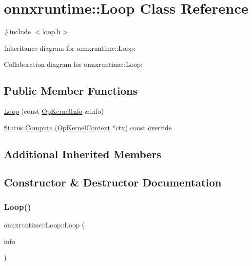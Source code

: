 \hypertarget{classonnxruntime_1_1Loop}{}\section{onnxruntime\+:\+:Loop Class Reference}
\label{classonnxruntime_1_1Loop}


{\ttfamily \#include $<$loop.\+h$>$}



Inheritance diagram for onnxruntime\+:\+:Loop\+:


Collaboration diagram for onnxruntime\+:\+:Loop\+:
\subsection*{Public Member Functions}
\begin{DoxyCompactItemize}
\item 
\mbox{\hyperlink{classonnxruntime_1_1Loop_a6a49331239b145bfb74d88288d8bff43}{Loop}} (const \mbox{\hyperlink{classonnxruntime_1_1OpKernelInfo}{Op\+Kernel\+Info}} \&info)
\item 
\mbox{\hyperlink{classonnxruntime_1_1common_1_1Status}{Status}} \mbox{\hyperlink{classonnxruntime_1_1Loop_acba8866150bcb6a81d05b59cd55d0b59}{Compute}} (\mbox{\hyperlink{classonnxruntime_1_1OpKernelContext}{Op\+Kernel\+Context}} $\ast$ctx) const override
\end{DoxyCompactItemize}
\subsection*{Additional Inherited Members}


\subsection{Constructor \& Destructor Documentation}
\mbox{\label{classonnxruntime_1_1Loop_a6a49331239b145bfb74d88288d8bff43}} 
\subsubsection{\texorpdfstring{Loop()}{Loop()}}
{\footnotesize\ttfamily onnxruntime\+::\+Loop\+::\+Loop (\begin{DoxyParamCaption}\item[{const \mbox{\hyperlink{classonnxruntime_1_1OpKernelInfo}{Op\+Kernel\+Info}} \&}]{info }\end{DoxyParamCaption})\hspace{0.3cm}{\ttfamily [inline]}}



